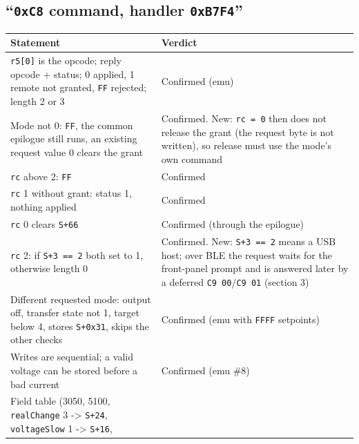 \subsection{\texorpdfstring{``\texttt{0xC8} command, handler
\texttt{0xB7F4}''}{``0xC8 command, handler 0xB7F4''}}\label{xc8-command-handler-0xb7f4}

{\def\LTcaptype{none} %
\begin{longtable}[]{@{}
  >{\raggedright\arraybackslash}p{}
  >{\raggedright\arraybackslash}p{}@{}}
\toprule\noalign{}
\begin{minipage}[b]{\linewidth}\raggedright
Statement
\end{minipage} & \begin{minipage}[b]{\linewidth}\raggedright
Verdict
\end{minipage} \\
\midrule\noalign{}
\endhead
\bottomrule\noalign{}
\endlastfoot
\texttt{r5{[}0{]}} is the opcode; reply opcode + status; 0 applied, 1
remote not granted, \texttt{FF} rejected; length 2 or 3 & Confirmed
(emu) \\
Mode not 0: \texttt{FF}, the common epilogue still runs, an existing
request value 0 clears the grant & Confirmed. New: \texttt{rc\ =\ 0}
then does not release the grant (the request byte is not written), so
release must use the mode's own command \\
\texttt{rc} above 2: \texttt{FF} & Confirmed \\
\texttt{rc} 1 without grant: status 1, nothing applied & Confirmed \\
\texttt{rc} 0 clears \texttt{S+66} & Confirmed (through the epilogue) \\
\texttt{rc} 2: if \texttt{S+3\ ==\ 2} both set to 1, otherwise length 0
& Confirmed. New: \texttt{S+3\ ==\ 2} means a USB host; over BLE the
request waits for the front-panel prompt and is answered later by a
deferred \texttt{C9\ 00}/\texttt{C9\ 01} (section 3) \\
Different requested mode: output off, transfer state not 1, target below
4, stores \texttt{S+0x31}, skips the other checks & Confirmed (emu with
\texttt{FFFF} setpoints) \\
Writes are sequential; a valid voltage can be stored before a bad
current & Confirmed (emu \#8) \\
Field table (3050, 5100, \texttt{realChange} 3 -\textgreater{}
\texttt{S+24}, \texttt{voltageSlow} 1 -\textgreater{} \texttt{S+16},

\end{longtable}}
